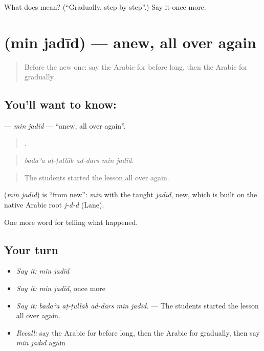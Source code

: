 \begin{tcolorbox}[breakable,colback=teal!4,colframe=teal!35!black,title={Before you move on}]
What does  mean? (\textquotedblleft{}Gradually, step by step\textquotedblright{}.) Say it once more.
\end{tcolorbox}
\section[\texorpdfstring{\ar{من} \ar{جديد} (min jadīd)}{من جديد (min jadīd)}]{  (min jadīd) — anew, all over again}

\label{lesson:AR-C313-min-jadid}



\begin{quote}
Before the new one: say the Arabic for before long, then the Arabic for gradually.
\end{quote}

\subsection*{You'll want to know:  }
\textbf{ } — \emph{min jadīd} — \textquotedblleft{}anew, all over again\textquotedblright{}.

\begin{quote}
    .
\end{quote}

\begin{quote}
\emph{badaʾa aṭ-ṭullāb ad-dars min jadīd.}
\end{quote}

\begin{quote}
The students started the lesson all over again.
\end{quote}

\begin{cousinweb}
\textbf{ } (\emph{min jadīd}) is \textquotedblleft{}from new\textquotedblright{}: \emph{min} with the taught \emph{jadīd}, new, which is built on the native Arabic root \emph{j-d-d} (Lane).
\end{cousinweb}

\begin{grammarlens}[title={What you've built}]
One more word for telling what happened.
\end{grammarlens}

\subsection*{Your turn}
\begin{itemize}
\raggedright
  \item \emph{Say it:} \emph{min jadīd}
  \item \emph{Say it:} \emph{min jadīd}, once more
  \item \emph{Say it:} \emph{badaʾa aṭ-ṭullāb ad-dars min jadīd.} — The students started the lesson all over again.
  \item \emph{Recall:} say the Arabic for before long, then the Arabic for gradually, then say \emph{min jadīd} again
\end{itemize}


